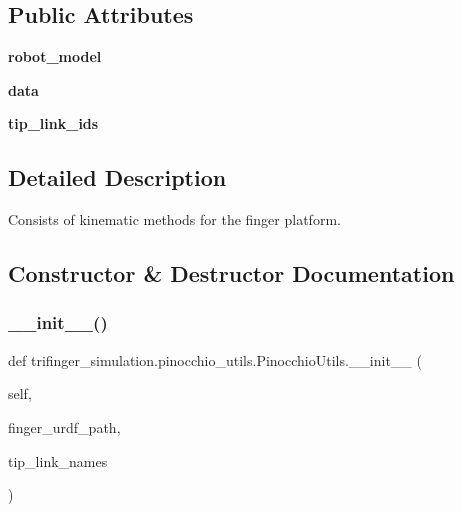 \subsection*{Public Attributes}
\begin{DoxyCompactItemize}
\item 
\mbox{\label{classtrifinger__simulation_1_1pinocchio__utils_1_1PinocchioUtils_a03966c711bac3bfb20b49aad1a308b5d}} 
{\bfseries robot\+\_\+model}
\item 
\mbox{\label{classtrifinger__simulation_1_1pinocchio__utils_1_1PinocchioUtils_ae1ff46bd1c7f0d5d888219b077c04375}} 
{\bfseries data}
\item 
\mbox{\label{classtrifinger__simulation_1_1pinocchio__utils_1_1PinocchioUtils_ad12a1694ed21988983be3736d51b1a5b}} 
{\bfseries tip\+\_\+link\+\_\+ids}
\end{DoxyCompactItemize}


\subsection{Detailed Description}
Consists of kinematic methods for the finger platform. 

\subsection{Constructor \& Destructor Documentation}
\mbox{\label{classtrifinger__simulation_1_1pinocchio__utils_1_1PinocchioUtils_a84604fe179b9237b4a842bf03a9640cb}} 
\subsubsection{\texorpdfstring{\+\_\+\+\_\+init\+\_\+\+\_\+()}{\_\_init\_\_()}}
{\footnotesize\ttfamily def trifinger\+\_\+simulation.\+pinocchio\+\_\+utils.\+Pinocchio\+Utils.\+\_\+\+\_\+init\+\_\+\+\_\+ (\begin{DoxyParamCaption}\item[{}]{self,  }\item[{}]{finger\+\_\+urdf\+\_\+path,  }\item[{}]{tip\+\_\+link\+\_\+names }\end{DoxyParamCaption})}



